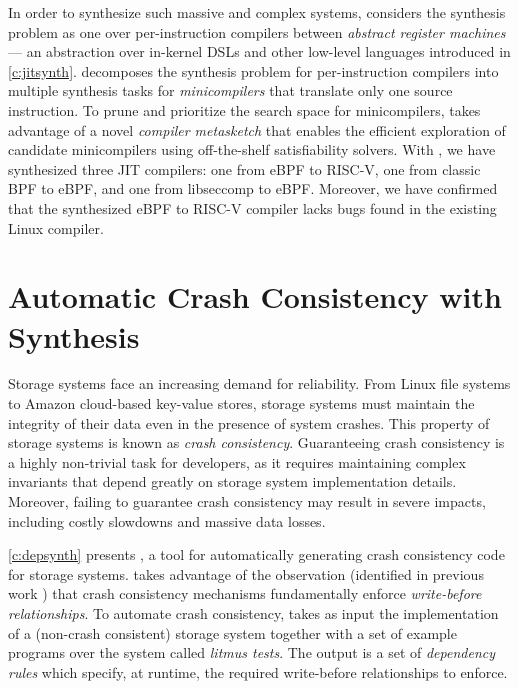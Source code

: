 In order to synthesize such massive and complex systems,
\jitsynth considers the synthesis problem as one over per-instruction compilers
between \textit{abstract register machines} --- an abstraction over
in-kernel DSLs and other low-level languages introduced in \cref{c:jitsynth}.
\jitsynth decomposes the synthesis problem for per-instruction compilers
into multiple synthesis tasks for \textit{minicompilers}
that translate only one source instruction.%
To prune and prioritize the search space for minicompilers,
\jitsynth takes advantage of a novel \textit{compiler metasketch}
that enables the efficient exploration of candidate minicompilers
using off-the-shelf satisfiability solvers.
With \jitsynth, we have synthesized three JIT compilers:
one from eBPF to RISC-V,
one from classic BPF to eBPF,
and one from libseccomp to eBPF.
Moreover, we have confirmed that the synthesized eBPF to RISC-V compiler
lacks bugs found in the existing Linux compiler.

\section{Automatic Crash Consistency with Synthesis}
Storage systems face an increasing demand for reliability.
From Linux file systems to Amazon cloud-based key-value stores,
storage systems must maintain the integrity of their data
even in the presence of system crashes.
This property of storage systems is known as \textit{crash consistency}.
Guaranteeing crash consistency is a highly non-trivial task for developers,
as it requires maintaining complex invariants that depend greatly on
storage system implementation details.
Moreover, failing to guarantee crash consistency may result in severe impacts,
including costly slowdowns and massive data losses. %

\cref{c:depsynth} presents \depsynth, a tool for automatically generating crash consistency
code for storage systems.
\depsynth takes advantage of the observation
(identified in previous work )
that crash consistency mechanisms fundamentally enforce \textit{write-before relationships}.
To automate crash consistency,
\depsynth takes as input the implementation of a (non-crash consistent) storage system together
with a set of example programs over the system called \textit{litmus tests}.
The output is a set of \textit{dependency rules} which specify, at runtime,
the required write-before relationships to enforce.

